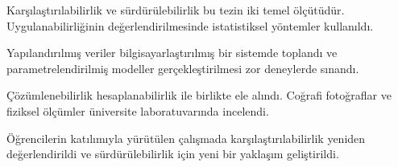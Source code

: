 \documentclass{article}
\begin{document}
Karşılaştırılabilirlik ve sürdürülebilirlik bu tezin iki temel ölçütüdür.
Uygulanabilirliğinin değerlendirilmesinde istatistiksel yöntemler kullanıldı.

Yapılandırılmış veriler bilgisayarlaştırılmış bir sistemde toplandı ve
parametrelendirilmiş modeller gerçekleştirilmesi zor deneylerde sınandı.

Çözümlenebilirlik hesaplanabilirlik ile birlikte ele alındı. Coğrafi
fotoğraflar ve fiziksel ölçümler üniversite laboratuvarında incelendi.

Öğrencilerin katılımıyla yürütülen çalışmada karşılaştırılabilirlik yeniden
değerlendirildi ve sürdürülebilirlik için yeni bir yaklaşım geliştirildi.
\end{document}

